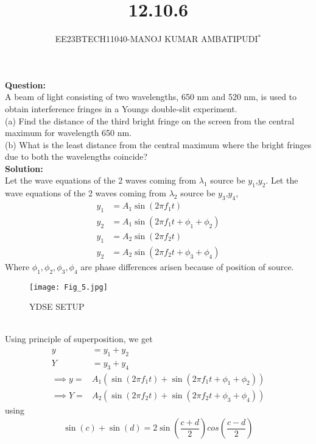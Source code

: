 \documentclass[journal,12pt,twocolumn]{IEEEtran}
\theoremstyle{remark}
\begin{document}

\vspace{3cm}
\title{\textbf{12.10.6}}
\author{EE23BTECH11040-MANOJ KUMAR AMBATIPUDI$^{*}$%
}
\maketitle
\newpage
\bigskip
\renewcommand{\thefigure}{\theenumi}
\renewcommand{\thetable}{\theenumi}
\textbf{Question:}
\\
A beam of light consisting of two wavelengths, 650 nm and 520 nm, is used to
obtain interference fringes in a Youngs double-slit experiment.\\
(a) Find the distance of the third bright fringe on the screen from
the central maximum for wavelength 650 nm.\\
(b) What is the least distance from the central maximum where the
bright fringes due to both the wavelengths coincide?
\\
\textbf{Solution:}
\\
Let the wave equations of the 2 waves coming from $\lambda_1$ source be $y_1$,$y_2$. Let the wave equations of the 2 waves coming from $\lambda_2$ source be $y_3$,$y_4$, 
\begin{align}
    y_1 &= A_1\sin(2\pi f_1t) \\
    y_2 &= A_1\sin(2\pi f_1t+\phi_1+\phi_2)\\
    y_1 &= A_2\sin(2\pi f_2t) \\
    y_2 &= A_2\sin(2\pi f_2t+\phi_3+\phi_4)
\end{align}
Where $\phi_1,\phi_2,\phi_3,\phi_4$ are phase differences arisen because of position of source.\\
\begin{figure}[h!]
\renewcommand\thefigure{1}
\centering
\texttt{[image: Fig\_5.jpg]}
\caption{YDSE SETUP}
\label{fig:enter-label}
\end{figure}
\\
Using principle of superposition, we get 
\begin{align}
    y &= y_1+y_2\\ 
    Y &= y_3+y_4\\
\implies y=&A_1(\sin(2\pi f_1t)+\sin(2\pi f_1t+\phi_1+\phi_2))\\
\implies Y=&A_2(\sin(2\pi f_2t)+\sin(2\pi f_2t+\phi_3+\phi_4))
\end{align}
using
\begin{align}
    \sin(c)+\sin(d)=2\sin(\dfrac{c+d}{2})cos(\dfrac{c-d}{2})
\end{align}
\end{document}
